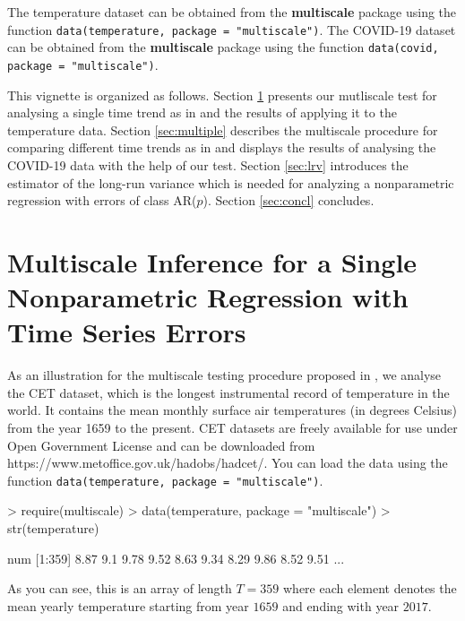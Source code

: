 \documentclass[a4paper]{scrartcl}
\begin{document}
The temperature dataset can be obtained from the \textbf{multiscale} package using the function \verb|data(temperature, package = "multiscale")|. The COVID-19 dataset can be obtained from the \textbf{multiscale} package using the function \linebreak \verb|data(covid, package = "multiscale")|.

This vignette is organized as follows. Section \ref{sec:single} presents our mutliscale test for analysing a single time trend as in\cite{KhismatullinaVogt2020a} and the results of applying it to the temperature data. Section \ref{sec:multiple} describes the multiscale procedure for comparing different time trends as in \cite{KhismatullinaVogt2020b} and displays the results of analysing the COVID-19 data with the help of our test. Section \ref{sec:lrv} introduces the estimator of the long-run variance which is needed for analyzing a nonparametric regression with errors of class AR($p$). Section \ref{sec:concl} concludes.


\section{Multiscale Inference for a Single Nonparametric Regression with Time Series Errors}\label{sec:single}

As an illustration for the multiscale testing procedure proposed in \cite{KhismatullinaVogt2020a}, we analyse the CET dataset, which is the longest instrumental record of temperature in the world. It contains the mean monthly surface air temperatures (in degrees Celsius) from the year 1659 to the present. CET datasets are freely available for use under Open Government License and can be downloaded from https://www.metoffice.gov.uk/hadobs/hadcet/. You can load the data using the function \verb|data(temperature, package = "multiscale")|.

\begin{Schunk}
\begin{Sinput}
> require(multiscale)
> data(temperature, package = "multiscale")
> str(temperature)
\end{Sinput}
\begin{Soutput}
 num [1:359] 8.87 9.1 9.78 9.52 8.63 9.34 8.29 9.86 8.52 9.51 ...
\end{Soutput}
\end{Schunk}

As you can see, this is an array of length $T = 359$ where each element denotes the mean yearly temperature starting from year $1659$ and ending with year $2017$.
\end{document}
